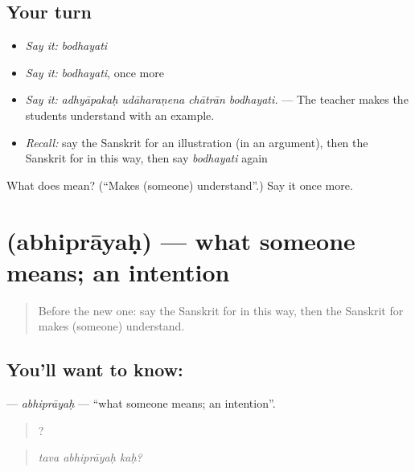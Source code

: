 \subsection*{Your turn}
\begin{itemize}
\raggedright
  \item \emph{Say it:} \emph{bodhayati}
  \item \emph{Say it:} \emph{bodhayati}, once more
  \item \emph{Say it:} \emph{adhyāpakaḥ udāharaṇena chātrān bodhayati.} — The teacher makes the students understand with an example.
  \item \emph{Recall:} say the Sanskrit for an illustration (in an argument), then the Sanskrit for in this way, then say \emph{bodhayati} again
\end{itemize}

\begin{tcolorbox}[breakable,colback=teal!4,colframe=teal!35!black,title={Before you move on}]
What does  mean? (\textquotedblleft{}Makes (someone) understand\textquotedblright{}.) Say it once more.
\end{tcolorbox}
\section[\texorpdfstring{\sk{अभिप्रायः} (abhiprāyaḥ)}{अभिप्रायः (abhiprāyaḥ)}]{ (abhiprāyaḥ) — what someone means; an intention}

\label{lesson:SA-C347-abhiprayah}



\begin{quote}
Before the new one: say the Sanskrit for in this way, then the Sanskrit for makes (someone) understand.
\end{quote}

\subsection*{You'll want to know: }
\textbf{} — \emph{abhiprāyaḥ} — \textquotedblleft{}what someone means; an intention\textquotedblright{}.

\begin{quote}
  ?
\end{quote}

\begin{quote}
\emph{tava abhiprāyaḥ kaḥ?}
\end{quote}

